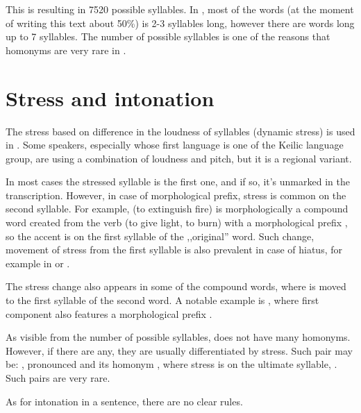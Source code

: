 This is resulting in 7520 possible syllables. In \andro, most of the words (at
the moment of writing this text about 50\%) is 2-3 syllables long, however there
are words long up to 7 syllables. The number of possible syllables is one of the
reasons that homonyms are very rare in \andro.

\section{Stress and intonation}

The stress based on difference in the loudness of syllables (dynamic stress) is
used in \andro. Some speakers, especially whose first language is one of the
Keilic language group, are using a combination of loudness and pitch, but it is
a regional variant.

In most cases the stressed syllable is the first one, and if so, it's unmarked
in the transcription. However, in case of morphological prefix, stress is common
on the second syllable. For example,   (to
extinguish fire) is morphologically a compound word created from the verb
  (to give light, to burn) with a morphological prefix
, so the accent is on the first syllable of the ,,original'' word. Such
change, movement of stress from the first syllable is also prevalent in case of
hiatus, for example in  or .

The stress change also appears in some of the compound words, where is moved to
the first syllable of the second word. A notable example is
 , where first component also
features a morphological prefix .

As visible from the number of possible syllables, \andro does not have many
homonyms. However, if there are any, they are usually differentiated by stress.
Such pair may be: , pronounced  and its homonym
, where stress is on the ultimate syllable, . Such
pairs are very rare.

As for intonation in a sentence, there are no clear rules.